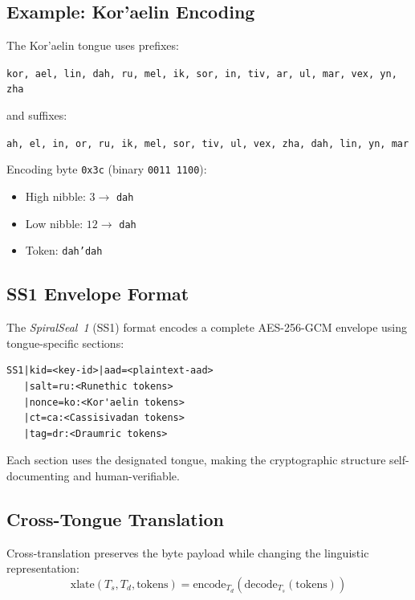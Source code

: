 \documentclass[11pt,a4paper]{article}
\begin{document}
\subsection{Example: Kor'aelin Encoding}

The Kor'aelin tongue uses prefixes:
\begin{center}
\texttt{kor, ael, lin, dah, ru, mel, ik, sor, in, tiv, ar, ul, mar, vex, yn, zha}
\end{center}
and suffixes:
\begin{center}
\texttt{ah, el, in, or, ru, ik, mel, sor, tiv, ul, vex, zha, dah, lin, yn, mar}
\end{center}

Encoding byte \texttt{0x3c} (binary \texttt{0011\,1100}):
\begin{itemize}
  \item High nibble: $3 \to$ \texttt{dah}
  \item Low nibble: $12 \to$ \texttt{dah}
  \item Token: \texttt{dah'dah}
\end{itemize}

\subsection{SS1 Envelope Format}

The \emph{SpiralSeal~1} (SS1) format encodes a complete AES-256-GCM
envelope using tongue-specific sections:

\begin{lstlisting}[caption={SS1 Envelope Format}]
SS1|kid=<key-id>|aad=<plaintext-aad>
   |salt=ru:<Runethic tokens>
   |nonce=ko:<Kor'aelin tokens>
   |ct=ca:<Cassisivadan tokens>
   |tag=dr:<Draumric tokens>
\end{lstlisting}

Each section uses the designated tongue, making the cryptographic
structure self-documenting and human-verifiable.

\subsection{Cross-Tongue Translation}

Cross-translation preserves the byte payload while changing the
linguistic representation:
\begin{equation}
  \text{xlate}(T_s, T_d, \text{tokens}) =
  \text{encode}_{T_d}\!\left(\text{decode}_{T_s}(\text{tokens})\right)
\end{equation}
\end{document}
